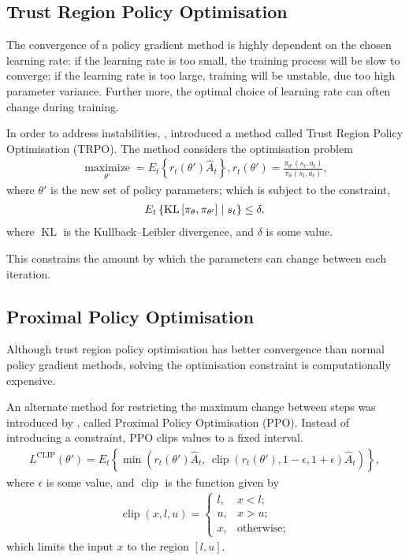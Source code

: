 \subsection{Trust Region Policy Optimisation}

The convergence of a policy gradient method is highly dependent on the chosen
learning rate:
if the learning rate is too small, the training process will be slow to
converge;
if the learning rate is too large, training will be unstable, due too high
parameter variance.
Further more, the optimal choice of learning rate can often change during
training.

In order to address instabilities, \cite{Schulman:2015:Trust}, introduced a
method called Trust Region Policy Optimisation (TRPO).
The method considers the optimisation problem
\begin{align*}
    \underset{\theta'}{\operatorname{maximize}} = E_t\left\{
        r_t(\theta')\hat{A}_t
    \right\},
    r_t(\theta') = \frac{\pi_{\theta'}(s_t,a_t)}{\pi_{\theta}(s_t,a_t)},
\end{align*}
where $\theta'$ is the new set of policy parameters; which is subject to the
constraint,
\begin{align*}
    E_t\left\{ \operatorname{KL}\left[\pi_{\theta},\pi_{\theta'}\right]
        \;\middle|\; s_t
    \right\} \leq \delta,
\end{align*}
where $\operatorname{KL}$ is the Kullback–Leibler divergence, and $\delta$ is
some value.

This constrains the amount by which the parameters can change between each
iteration.


\newpage
\subsection{Proximal Policy Optimisation}

Although trust region policy optimisation has better convergence than normal
policy gradient methods, solving the optimisation constraint is computationally
expensive.

An alternate method for restricting the maximum change between steps was
introduced by \cite{Schulman:2017:Proximal}, called Proximal Policy
Optimisation (PPO).
Instead of introducing a constraint, PPO clips values to a fixed interval.
\begin{align*}
    L^\text{CLIP}(\theta') = E_t\left\{ \min\left(
        r_t(\theta')\hat{A}_t,\,
        \operatorname{clip} (r_t(\theta'), 1 - \epsilon, 1 + \epsilon)\hat{A}_t
    \right) \right\},
\end{align*}
where $\epsilon$ is some value, and $\operatorname{clip}$ is the function given
by
\begin{align*}
    \operatorname{clip}(x,l,u) = \begin{cases}
        l, & x < l;\\
        u, & x > u;\\
        x, & \text{otherwise};
    \end{cases}
\end{align*}
which limits the input $x$ to the region $[l,u]$.



